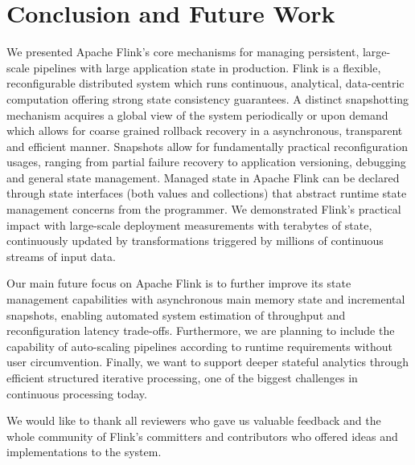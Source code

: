 
\section{Conclusion and Future Work}
\label{sec:conclusion}

We presented Apache Flink's core mechanisms for managing persistent, large-scale pipelines with large application state in production. Flink is a flexible, reconfigurable distributed system which runs continuous, analytical, data-centric computation offering strong state consistency guarantees. A distinct snapshotting mechanism acquires a global view of the system periodically or upon demand which allows for coarse grained rollback recovery in a asynchronous, transparent and efficient manner. Snapshots allow for fundamentally practical reconfiguration usages, ranging from partial failure recovery to application versioning, debugging and general state management. Managed state in Apache Flink can be declared through state interfaces (both values and collections) that abstract runtime state management concerns from the programmer. We demonstrated Flink's practical impact with large-scale deployment measurements with terabytes of state, continuously updated by transformations triggered by millions of continuous streams of input data.

 Our main future focus on Apache Flink is to further improve its state management capabilities with asynchronous main memory state and incremental snapshots, enabling automated system estimation of throughput and reconfiguration latency trade-offs. Furthermore, we are planning to include the capability of auto-scaling pipelines according to runtime requirements without user circumvention.  Finally, we want to support deeper stateful analytics through efficient structured iterative processing, one of the biggest challenges in continuous processing today. 

 We would like to thank all reviewers who gave us valuable feedback and the whole community of Flink's committers and contributors who offered ideas and implementations to the system. 